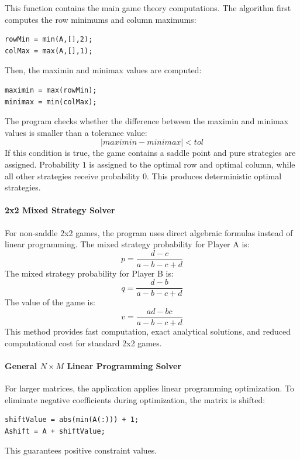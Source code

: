 \documentclass[12pt,a4paper]{article}
\begin{document}
This function contains the main game theory computations. The algorithm first computes the row minimums and column maximums:

\begin{lstlisting}[style=code]
rowMin = min(A,[],2);
colMax = max(A,[],1);
\end{lstlisting}

Then, the maximin and minimax values are computed:

\begin{lstlisting}[style=code]
maximin = max(rowMin);
minimax = min(colMax);
\end{lstlisting}

The program checks whether the difference between the maximin and minimax values is smaller than a tolerance value:
\[
|maximin-minimax|<tol
\]
If this condition is true, the game contains a saddle point and pure strategies are assigned. Probability \(1\) is assigned to the optimal row and optimal column, while all other strategies receive probability \(0\). This produces deterministic optimal strategies.

\paragraph{2x2 Mixed Strategy Solver}

For non-saddle 2x2 games, the program uses direct algebraic formulas instead of linear programming. The mixed strategy probability for Player A is:
\[
p=\frac{d-c}{a-b-c+d}
\]
The mixed strategy probability for Player B is:
\[
q=\frac{d-b}{a-b-c+d}
\]
The value of the game is:
\[
v=\frac{ad-bc}{a-b-c+d}
\] \cite{murthy2007}
This method provides fast computation, exact analytical solutions, and reduced computational cost for standard 2x2 games.

\paragraph{General \(N \times M\) Linear Programming Solver}

For larger matrices, the application applies linear programming optimization. To eliminate negative coefficients during optimization, the matrix is shifted:

\begin{lstlisting}[style=code]
shiftValue = abs(min(A(:))) + 1;
Ashift = A + shiftValue;
\end{lstlisting}

This guarantees positive constraint values.
\end{document}
